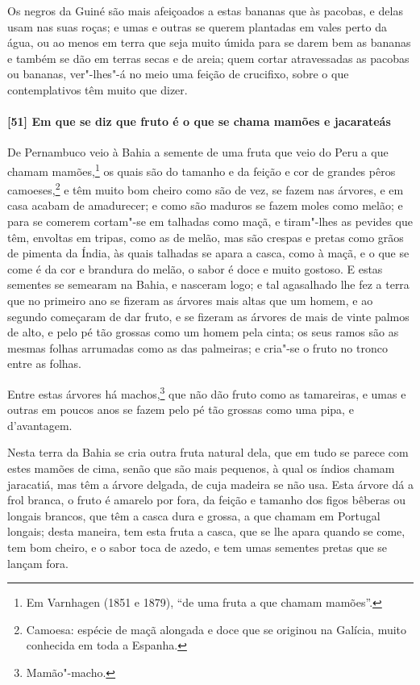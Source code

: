 Os negros da Guiné são mais afeiçoados a estas bananas que às pacobas, e delas usam nas
suas roças; e umas e outras se querem plantadas em vales perto da água, ou ao menos em
terra que seja muito úmida para se darem bem as bananas e também se dão em terras secas e
de areia; quem cortar atravessadas as pacobas ou bananas, ver"-lhes"-á no meio uma feição de
crucifixo, sobre o que contemplativos têm muito que dizer.

\paragraph{[51] Em que se diz que fruto é o que se chama mamões e jacarateás}\quad
De Pernambuco veio à Bahia a semente de uma fruta que veio do Peru a que chamam
mamões,\footnote{ Em Varnhagen (1851 e 1879), ``de uma fruta a que chamam mamões''.} os
quais são do tamanho e da feição e cor de grandes pêros camoeses,\footnote{ Camoesa:
espécie de maçã alongada e doce que se originou na Galícia, muito conhecida em toda a
Espanha.} e têm muito bom cheiro como são de vez, se fazem nas árvores, e em casa acabam
de amadurecer; e como são maduros se fazem moles como melão; e para se comerem cortam"-se
em talhadas como maçã, e tiram"-lhes as pevides que têm, envoltas em tripas, como as de
melão, mas são crespas e pretas como grãos de pimenta da Índia, às quais talhadas se apara
a casca, como à maçã, e o que se come é da cor e brandura do melão, o sabor é doce e muito
gostoso. E estas sementes se semearam na Bahia, e nasceram logo; e tal agasalhado lhe fez
a terra que no primeiro ano se fizeram as árvores mais altas que um homem, e ao segundo
começaram de dar fruto, e se fizeram as árvores de mais de vinte palmos de alto, e pelo pé
tão grossas como um homem pela cinta; os seus ramos são as mesmas folhas arrumadas como as
das palmeiras; e cria"-se o fruto no tronco entre as folhas.

Entre estas árvores há machos,\footnote{ Mamão"-macho.} que não dão fruto como as
tamareiras, e umas e outras em poucos anos se fazem pelo pé tão grossas como uma pipa, e
d'avantagem.

Nesta terra da Bahia se cria outra fruta natural dela, que em tudo se parece com estes
mamões de cima, senão que são mais pequenos, à qual os índios chamam jaracatiá, mas têm a
árvore delgada, de cuja madeira se não usa. Esta árvore dá a frol branca, o fruto é
amarelo por fora, da feição e tamanho dos figos bêberas ou longais brancos, que têm a
casca dura e grossa, a que chamam em Portugal longais; desta maneira, tem esta fruta a
casca, que se lhe apara quando se come, tem bom cheiro, e o sabor toca de azedo, e tem
umas sementes pretas que se lançam fora.

